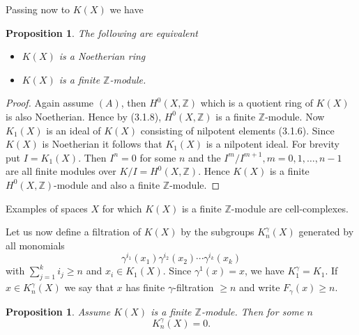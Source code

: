 \documentclass[leqno]{book}
\numberwithin{equation}{section}
\newtheorem{proposition}[theorem]{Proposition}
\theoremstyle{definition}
\begin{document}
            Passing now to $K(X)$ we have
            \begin{proposition}
              The following are equivalent
              \begin{itemize}
                \item[(A)] $K(X)$ is a Noetherian ring
                \item[(B)] $K(X)$ is a finite $\mathbb{Z}$-module.
              \end{itemize}
            \end{proposition}

            \begin{proof}
              Again assume $(A)$, then $H^{0}(X,\mathbb{Z})$ which is a quotient ring of $K(X)$ is also Noetherian. Hence by (3.1.8), $H^{0}(X,\mathbb{Z})$ is a finite $\mathbb{Z}$-module. Now $K_{1}(X)$ is an ideal of $K(X)$ consisting of nilpotent elements (3.1.6). Since $K(X)$ is Noetherian it follows that $K_1(X)$ is a nilpotent ideal. For brevity put $I=K_1(X)$. Then $I^{n}=0$ for some $n$ and the $I^{m}/I^{m+1},  m=0,1, \ldots ,n-1$ are all finite modules over $K/I=H^{0}(X,\mathbb{Z})$. Hence $K(X)$ is a finite $H^{0}(X,\mathbb{Z})$-module and also a finite $\mathbb{Z}$-module.
            \end{proof}

            Examples of spaces $X$ for which $K(X)$ is a finite $\mathbb{Z}$-module are cell-complexes.

            Let us now define a filtration of $K(X)$ by the subgroups $K_{n}^{\gamma}(X)$ generated by all monomials
            \begin{equation*}
              \gamma^{i_1}(x_1)\gamma^{i_2}(x_2)\cdots \gamma^{i_{k}}(x_{k})
            \end{equation*}
            with $\sum_{j=1}^{k}i_{j}\ge n$ and $x_i \in K_1(X)$. Since $\gamma^{1}(x)=x$, we have $K_1^{\gamma}=K_1$. If $x \in K^{\gamma}_{n}(X)$ we say that $x$ has finite $\gamma$-filtration $\ge n$ and write $F_{\gamma}(x)\ge n$.

            \begin{proposition}
              Assume $K(X)$ is a finite $\mathbb{Z}$-module. Then for some $n$
              \begin{equation*}
                K^{\gamma}_{n}(X)=0.
              \end{equation*}
            \end{proposition}
\end{document}
